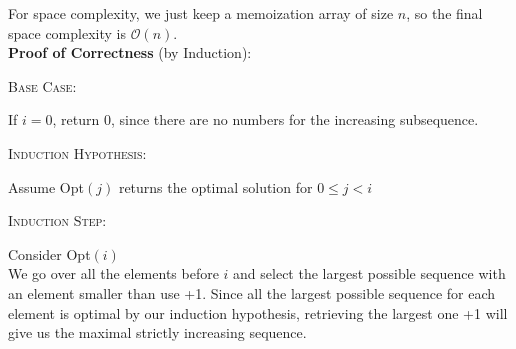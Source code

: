 \documentclass[12pt]{article}
\begin{document}
For space complexity, we just keep a memoization array of size $n$, so the final space complexity is $\mathcal{O}(n)$.\\

\newpage
\textbf{Proof of Correctness} (by Induction):
\begin{adjustwidth}{10mm}{}
	\textsc{Base Case}:
	\begin{adjustwidth}{10mm}{}
		If $i = 0$, return 0, since there are no numbers for the increasing subsequence.
	\end{adjustwidth}
	\textsc{Induction Hypothesis}:
	\begin{adjustwidth}{10mm}{}
		Assume Opt$(j)$ returns the optimal solution for $0 \leq j < i$
	\end{adjustwidth}
	\textsc{Induction Step}:
	\begin{adjustwidth}{10mm}{}
		Consider Opt$(i)$\\
		We go over all the elements before $i$ and select the largest possible sequence with an element smaller than use +1.
		Since all the largest possible sequence for each element is optimal by our induction hypothesis,
		retrieving the largest one +1 will give us the maximal strictly increasing sequence.
	\end{adjustwidth}
\end{adjustwidth}
\end{document}
